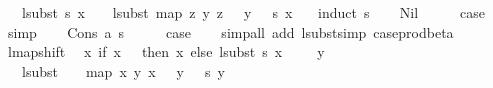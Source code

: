\begin{isabellebody}
\ \ \ {\isachardoublequoteopen}{\isacharparenleft}{\kern0pt}lsubst\ s{\isacharparenright}{\kern0pt}\ x\ {\isacharplus}{\kern0pt}\ {}\ {\isacharequal}{\kern0pt}\ lsubst\ {\isacharparenleft}{\kern0pt}map\ {\isacharparenleft}{\kern0pt}{\isasymlambda}{\isacharparenleft}{\kern0pt}z{\isacharcomma}{\kern0pt}\ y{\isacharparenright}{\kern0pt}{\isachardot}{\kern0pt}\ {\isacharparenleft}{\kern0pt}z\ {\isacharplus}{\kern0pt}\ {}{\isacharcomma}{\kern0pt}\ y\ {\isacharplus}{\kern0pt}\ {}{\isacharparenright}{\kern0pt}{\isacharparenright}{\kern0pt}\ s{\isacharparenright}{\kern0pt}\ {\isacharparenleft}{\kern0pt}x\ {\isacharplus}{\kern0pt}\ {}{\isacharparenright}{\kern0pt}{\isachardoublequoteclose}\isanewline
%
\isadelimproof
%
\endisadelimproof
%
\isatagproof
{}\isamarkupfalse%
\ {\isacharparenleft}{\kern0pt}induct\ s{\isacharparenright}{\kern0pt}\isanewline
\ \ \isamarkupfalse%
\ Nil\isanewline
\ \ \isamarkupfalse%
\ \isamarkupfalse%
\ {\isacharquery}{\kern0pt}case\isanewline
\ \ \isamarkupfalse%
\ simp\isanewline
{}\isamarkupfalse%
\isanewline
\ \ \isamarkupfalse%
\ {\isacharparenleft}{\kern0pt}Cons\ a\ s{\isacharparenright}{\kern0pt}\isanewline
\ \ \isamarkupfalse%
\ \isamarkupfalse%
\ {\isacharquery}{\kern0pt}case\isanewline
\ \ \isamarkupfalse%
\ {\isacharparenleft}{\kern0pt}simp{\isacharunderscore}{\kern0pt}all\ add{\isacharcolon}{\kern0pt}\ lsubst{\isacharunderscore}{\kern0pt}simp\ case{\isacharunderscore}{\kern0pt}prod{\isacharunderscore}{\kern0pt}beta{\isacharparenright}{\kern0pt}\isanewline
{}\isamarkupfalse%
%
\endisatagproof
{\isafoldproof}%
%
\isadelimproof
\isanewline
%
\endisadelimproof
\isanewline
\isanewline
{}\isamarkupfalse%
\ lmap{\isacharunderscore}{\kern0pt}shift{}{\isacharcolon}{\kern0pt}\isanewline
\ \ {\isachardoublequoteopen}{\isacharparenleft}{\kern0pt}{\isasymlambda}x{\isachardot}{\kern0pt}\ if\ x\ {\isacharequal}{\kern0pt}\ {}\ then\ x\ else\ {\isacharparenleft}{\kern0pt}{\isacharparenleft}{\kern0pt}lsubst\ s{\isacharparenright}{\kern0pt}\ {\isacharparenleft}{\kern0pt}x\ {\isacharminus}{\kern0pt}\ {}{\isacharparenright}{\kern0pt}\ {\isacharplus}{\kern0pt}\ {}{\isacharparenright}{\kern0pt}{\isacharparenright}{\kern0pt}\ y\ {\isacharequal}{\kern0pt}\isanewline
\ \ \ lsubst\ {\isacharparenleft}{\kern0pt}{\isacharparenleft}{\kern0pt}{}{\isacharcomma}{\kern0pt}\ {}{\isacharparenright}{\kern0pt}\ {\isacharhash}{\kern0pt}\ map\ {\isacharparenleft}{\kern0pt}{\isasymlambda}{\isacharparenleft}{\kern0pt}x{\isacharcomma}{\kern0pt}\ y{\isacharparenright}{\kern0pt}{\isachardot}{\kern0pt}\ {\isacharparenleft}{\kern0pt}x\ {\isacharplus}{\kern0pt}\ {}{\isacharcomma}{\kern0pt}\ y\ {\isacharplus}{\kern0pt}\ {}{\isacharparenright}{\kern0pt}{\isacharparenright}{\kern0pt}\ s{\isacharparenright}{\kern0pt}\ y{\isachardoublequoteclose}\isanewline

\end{isabellebody}
